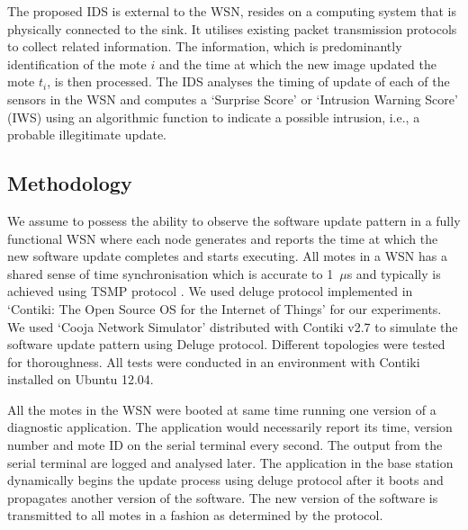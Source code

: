 \documentclass[conference,final]{IEEEtran}
\newcommand{\dme}[2]{\pdfmarkupcomment[markup=Highlight,color=yellow]{#1}{#2}}
\begin{document}
The proposed IDS is external to the WSN, resides on a computing system that is physically connected to the sink.
It utilises existing packet transmission protocols to collect related information. The information, which is predominantly identification of the mote $i$ and the time at which the new image updated the mote $t_i$, is then processed.
The IDS analyses the timing of update of each of the sensors in the WSN and computes a `Surprise Score' or `Intrusion Warning Score' (IWS) using an algorithmic function to indicate a possible intrusion, i.e., a probable illegitimate update.



\subsection{Methodology}
\label{subsec:meth}

We assume to possess the ability to observe the software update pattern in a fully functional WSN where each node generates and reports the time at which the new software update completes and starts executing.
All motes in a WSN has a shared sense of time synchronisation which is accurate to 1~$\mu$s  and typically is achieved using TSMP protocol \cite{Pister08tsmp:time}.
We used deluge protocol implemented in `Contiki: The Open Source OS for the Internet of Things' for our experiments. 
We used `Cooja Network Simulator' distributed with Contiki v2.7 to simulate the software update pattern using Deluge protocol. Different topologies were tested for thoroughness. 
All tests were conducted in an environment with Contiki installed on Ubuntu 12.04.

All the motes in the WSN were booted at same time running one version of a diagnostic application. 
The application would necessarily report its time, version number and mote ID on the serial terminal every second. 
The output from the serial terminal are logged and analysed later.
The application in the base station dynamically begins the update process using deluge protocol after it boots and propagates another version of the software. 
The new version of the software is transmitted to all motes in a fashion as determined by the protocol. 
\end{document}
